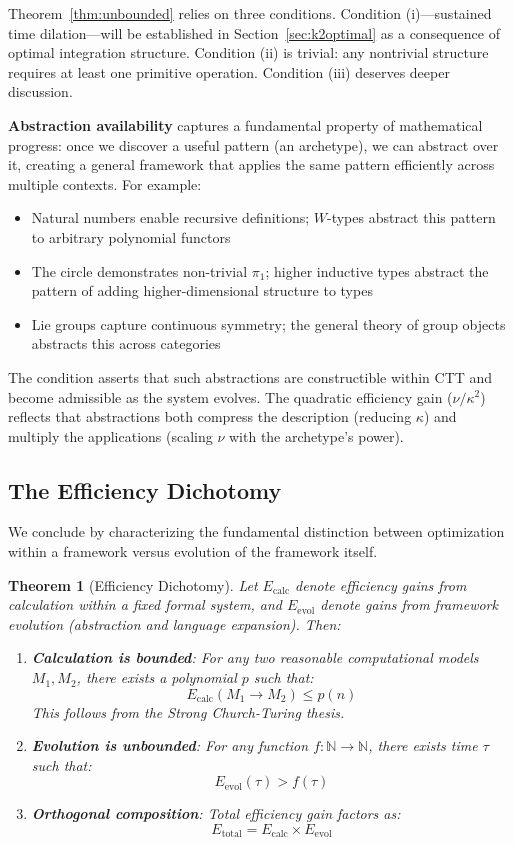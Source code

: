 \documentclass[11pt]{article}
\theoremstyle{definition}
\theoremstyle{plain}
\newtheorem{theorem}{Theorem}
\theoremstyle{remark}
\begin{document}
Theorem~\ref{thm:unbounded} relies on three conditions. Condition (i)—sustained time dilation—will be established in Section~\ref{sec:k2optimal} as a consequence of optimal integration structure. Condition (ii) is trivial: any nontrivial structure requires at least one primitive operation. Condition (iii) deserves deeper discussion.

\textbf{Abstraction availability} captures a fundamental property of mathematical progress: once we discover a useful pattern (an archetype), we can abstract over it, creating a general framework that applies the same pattern efficiently across multiple contexts. For example:
\begin{itemize}
\item Natural numbers enable recursive definitions; $W$-types abstract this pattern to arbitrary polynomial functors
\item The circle demonstrates non-trivial $\pi_1$; higher inductive types abstract the pattern of adding higher-dimensional structure to types
\item Lie groups capture continuous symmetry; the general theory of group objects abstracts this across categories
\end{itemize}

The condition asserts that such abstractions are constructible within CTT and become admissible as the system evolves. The quadratic efficiency gain ($\nu/\kappa^2$) reflects that abstractions both compress the description (reducing $\kappa$) and multiply the applications (scaling $\nu$ with the archetype's power).

\subsection{The Efficiency Dichotomy}

We conclude by characterizing the fundamental distinction between optimization within a framework versus evolution of the framework itself.

\begin{theorem}[Efficiency Dichotomy]\label{thm:dichotomy}
Let $E_{\text{calc}}$ denote efficiency gains from calculation within a fixed formal system, and $E_{\text{evol}}$ denote gains from framework evolution (abstraction and language expansion). Then:
\begin{enumerate}
\item \textbf{Calculation is bounded}: For any two reasonable computational models $M_1, M_2$, there exists a polynomial $p$ such that:
\[
E_{\text{calc}}(M_1 \to M_2) \leq p(n)
\]
This follows from the Strong Church-Turing thesis.
\item \textbf{Evolution is unbounded}: For any function $f: \mathbb{N} \to \mathbb{N}$, there exists time $\tau$ such that:
\[
E_{\text{evol}}(\tau) > f(\tau)
\]
\item \textbf{Orthogonal composition}: Total efficiency gain factors as:
\[
E_{\text{total}} = E_{\text{calc}} \times E_{\text{evol}}
\]
\end{enumerate}
\end{theorem}
\end{document}
